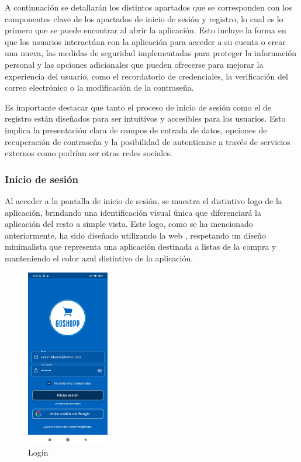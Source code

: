 \documentclass{article}
\begin{document}
A continuación se detallarán los distintos apartados que se corresponden con los componentes clave de los apartados de inicio de sesión y registro, lo cual es lo primero que se puede encontrar al abrir la aplicación. Esto incluye la forma en que los usuarios interactúan con la aplicación para acceder a su cuenta o crear una nueva, las medidas de seguridad implementadas para proteger la información personal y las opciones adicionales que pueden ofrecerse para mejorar la experiencia del usuario, como el recordatorio de credenciales, la verificación del correo electrónico o la modificación de la contraseña.

Es importante destacar que tanto el proceso de inicio de sesión como el de registro están diseñados para ser intuitivos y accesibles para los usuarios. Esto implica la presentación clara de campos de entrada de datos, opciones de recuperación de contraseña y la posibilidad de autenticarse a través de servicios externos como podrían ser otras redes sociales.

\subsubsection{Inicio de sesión}

Al acceder a la pantalla de inicio de sesión, se muestra el distintivo logo de la aplicación, brindando una identificación visual única que diferenciará la aplicación del resto a simple vista. Este logo, como se ha mencionado anteriormente, ha sido diseñado utilizando la web \textit{}, respetando un diseño minimalista que representa una aplicación destinada a listas de la compra y manteniendo el color azul distintivo de la aplicación.

\begin{figure}
    \includegraphics[width=0.32\textwidth]{imagenes/pantallas/inicio/login.jpg}
    \caption{Login}
    \vspace{-2\intextsep}
\end{figure}
\end{document}
